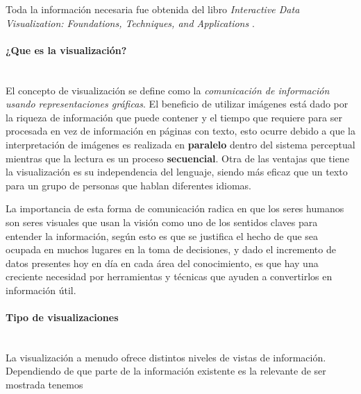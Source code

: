 \documentclass[12pt]{article}
\begin{document}
	Toda la información necesaria fue obtenida del libro \textit{Interactive Data Visualization: Foundations, Techniques, and Applications} \cite{libro_visualizacion}.

	\paragraph{¿Que es la visualización?} \hfill \\ %
	
	El concepto de visualización se define como la \textit{comunicación de información usando representaciones gráficas}. El beneficio de utilizar imágenes está dado por la riqueza de información que puede contener y el tiempo que requiere para ser procesada en vez de información en páginas con texto, esto ocurre debido a que la interpretación de imágenes es realizada en \textbf{paralelo} dentro del sistema perceptual mientras que la lectura es un proceso \textbf{secuencial}. Otra de las ventajas que tiene la visualización es su independencia del lenguaje, siendo más eficaz que un texto para un grupo de personas que hablan diferentes idiomas. 
	
	La importancia de esta forma de comunicación radica en que los seres humanos son seres visuales que usan la visión como uno de los sentidos claves para entender la información, según esto es que se justifica el hecho de que sea ocupada en muchos lugares en la toma de decisiones, y dado el incremento de datos presentes hoy en día en cada área del conocimiento, es que hay una creciente necesidad por herramientas y técnicas que ayuden a convertirlos en información útil. 
	
    
	\newpage
	\paragraph{Tipo de visualizaciones} \hfill \\
	
	La visualización a menudo ofrece distintos niveles de vistas de información. Dependiendo de que parte de la información existente es la relevante de ser mostrada tenemos
	
\end{document}
